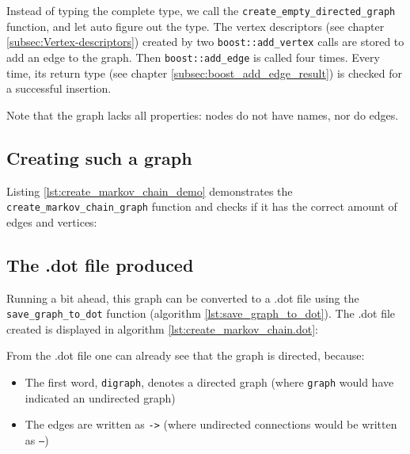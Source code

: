 

Instead of typing the complete type, 
we call the \verb;create_empty_directed_graph;
function, and let auto figure out the type.
The vertex descriptors (see chapter \ref{subsec:Vertex-descriptors}) 
created by two \verb;boost::add_vertex; 
calls are stored to add an edge to the graph.
Then \verb;boost::add_edge; 
is called four times.
Every time, its return type 
(see chapter \ref{subsec:boost_add_edge_result}) 
is checked for a successful insertion.

Note that the graph lacks all properties: nodes do not have names, nor do
edges.

\subsection{Creating such a graph}

Listing \ref{lst:create_markov_chain_demo} demonstrates 
the \verb;create_markov_chain_graph; function and checks if it
has the correct amount of edges and vertices:



\subsection{The .dot file produced}
\label{subsec:create_markov_chain_dot}

Running a bit ahead, this graph can be converted to a .dot file using the
\verb;save_graph_to_dot; function (algorithm \ref{lst:save_graph_to_dot}).
The .dot file created is displayed in algorithm \ref{lst:create_markov_chain.dot}:



From the .dot file one can already see that the graph is directed, because:

\begin{itemize}
  \item The first word, \verb;digraph;, denotes a directed graph 
    (where \verb;graph; would have indicated an undirected graph)
  \item The edges are written as \verb;->; 
   (where undirected connections would be written as \verb;–;)
\end{itemize}

